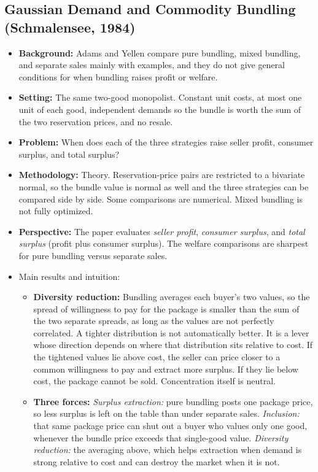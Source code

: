\documentclass[12pt]{article}
\begin{document}
\subsection{Gaussian Demand and Commodity Bundling (Schmalensee, 1984)}

\begin{itemize}
  \item \textbf{Background:} Adams and Yellen compare pure bundling, mixed bundling, and separate sales mainly with examples, and they do not give general conditions for when bundling raises profit or welfare.
  \item \textbf{Setting:} The same two-good monopolist. Constant unit costs, at most one unit of each good, independent demands so the bundle is worth the sum of the two reservation prices, and no resale.
  \item \textbf{Problem:} When does each of the three strategies raise seller profit, consumer surplus, and total surplus?
  \item \textbf{Methodology:} Theory. Reservation-price pairs are restricted to a bivariate normal, so the bundle value is normal as well and the three strategies can be compared side by side. Some comparisons are numerical. Mixed bundling is not fully optimized.
  \item \textbf{Perspective:} The paper evaluates \textit{seller profit}, \textit{consumer surplus}, and \textit{total surplus} (profit plus consumer surplus). The welfare comparisons are sharpest for pure bundling versus separate sales.
  \item Main results and intuition:
    \begin{itemize}
      \item \textbf{Diversity reduction:} Bundling averages each buyer's two values, so the spread of willingness to pay for the package is smaller than the sum of the two separate spreads, as long as the values are not perfectly correlated. A tighter distribution is not automatically better. It is a lever whose direction depends on where that distribution sits relative to cost. If the tightened values lie above cost, the seller can price closer to a common willingness to pay and extract more surplus. If they lie below cost, the package cannot be sold. Concentration itself is neutral.
      \item \textbf{Three forces:} \textit{Surplus extraction:} pure bundling posts one package price, so less surplus is left on the table than under separate sales. \textit{Inclusion:} that same package price can shut out a buyer who values only one good, whenever the bundle price exceeds that single-good value. \textit{Diversity reduction:} the averaging above, which helps extraction when demand is strong relative to cost and can destroy the market when it is not.

\end{itemize}
\end{itemize}
\end{document}
